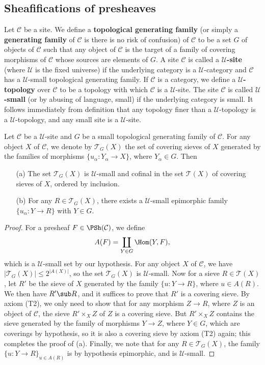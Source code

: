 \subsection{Sheafifications of presheaves}
Let $\mathcal{C}$ be a site. We define a \textbf{topological generating family} (or simply a \textbf{generating family} of $\mathcal{C}$ is there is no risk of confusion) of $\mathcal{C}$ to be a set $G$ of objects of $\mathcal{C}$ such that any object of $\mathcal{C}$ is the target of a family of covering morphisms of $\mathcal{C}$ whose sources are elements of $G$. A site $\mathcal{C}$ is called a \textbf{$\mathscr{U}$-site} (where $\mathscr{U}$ is the fixed universe) if the underlying category is a $\mathscr{U}$-category and $\mathcal{C}$ has a $\mathscr{U}$-small topological generating family. If $\mathcal{C}$ is a category, we define a \textbf{$\mathscr{U}$-topology} over $\mathcal{C}$ to be a topology with which $\mathcal{C}$ is a $\mathscr{U}$-site. The site $\mathcal{C}$ is called \textbf{$\mathscr{U}$-small} (or by abusing of language, small) if the underlying category is small. It follows immediately from definition that any topology finer than a $\mathscr{U}$-topology is a $\mathscr{U}$-topology, and any small site is a $\mathscr{U}$-site.
\begin{proposition}\label{site small generated sieve set prop}
Let $\mathcal{C}$ be a $\mathscr{U}$-site and $G$ be a small topological generating family of $\mathcal{C}$. For any object $X$ of $\mathcal{C}$, we denote by $\mathcal{T}_G(X)$ the set of covering sieves of $X$ generated by the families of morphisms $\{u_\alpha:Y_\alpha\to X\}$, where $Y_\alpha\in G$. Then
\begin{enumerate}
\item[(a)] The set $\mathcal{T}_G(X)$ is $\mathscr{U}$-small and cofinal in the set $\mathcal{T}(X)$ of covering sieves of $X$, ordered by inclusion.
\item[(b)] For any $R\in\mathcal{T}_G(X)$, there exists a $\mathscr{U}$-small epimorphic family $\{u_\alpha:Y\to R\}$ with $Y\in G$.
\end{enumerate}
\end{proposition}
\begin{proof}
For a presheaf $F\in\PSh(\mathcal{C})$, we define
\[A(F)=\coprod_{Y\in G}\Hom(Y,F),\]
which is a $\mathscr{U}$-small set by our hypothesis. For any object $X$ of $\mathcal{C}$, we have $|\mathcal{T}_G(X)|\leq 2^{|A(X)|}$, so the set $\mathcal{T}_G(X)$ is $\mathscr{U}$-small. Now for a sieve $R\in\mathcal{T}(X)$, let $R'$ be the sieve of $X$ generated by the family $\{u:Y\to R\}$, where $u\in A(R)$. We then have $R'\sub R$, and it suffices to prove that $R'$ is a covering sieve. By axiom (T2), we only need to show that for any morphism $Z\to R$, where $Z$ is an object of $\mathcal{C}$, the sieve $R'\times_XZ$ of $Z$ is a covering sieve. But $R'\times_XZ$ contains the sieve generated by the family of morphisms $Y\to Z$, where $Y\in G$, which are coverings by hypothesis, so it is also a covering sieve by axiom (T2) again; this completes the proof of (a). Finally, we note that for any $R\in \mathcal{T}_G(X)$, the family $\{u:Y\to R\}_{u\in A(R)}$ is by hypothesis epimorphic, and is $\mathscr{U}$-small.
\end{proof}
